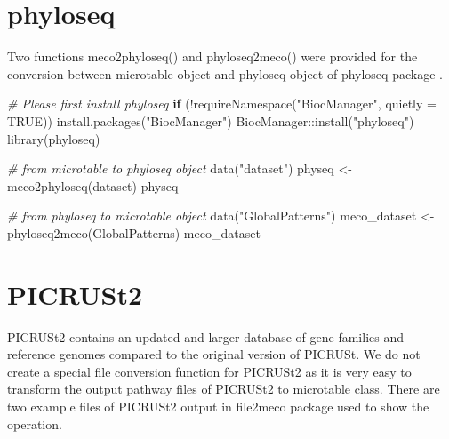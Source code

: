 \documentclass[
]{book}
\newenvironment{Shaded}{\begin{snugshade}}{\end{snugshade}}
\newcommand{\AttributeTok}[1]{\textcolor[rgb]{0.77,0.63,0.00}{#1}}
\newcommand{\CommentTok}[1]{\textcolor[rgb]{0.56,0.35,0.01}{\textit{#1}}}
\newcommand{\ConstantTok}[1]{\textcolor[rgb]{0.00,0.00,0.00}{#1}}
\newcommand{\ControlFlowTok}[1]{\textcolor[rgb]{0.13,0.29,0.53}{\textbf{#1}}}
\newcommand{\FunctionTok}[1]{\textcolor[rgb]{0.00,0.00,0.00}{#1}}
\newcommand{\NormalTok}[1]{#1}
\newcommand{\OtherTok}[1]{\textcolor[rgb]{0.56,0.35,0.01}{#1}}
\newcommand{\SpecialCharTok}[1]{\textcolor[rgb]{0.00,0.00,0.00}{#1}}
\newcommand{\StringTok}[1]{\textcolor[rgb]{0.31,0.60,0.02}{#1}}
\begin{document}
\hypertarget{phyloseq}{%
\section{phyloseq}\label{phyloseq}}

Two functions meco2phyloseq() and phyloseq2meco() were provided for the conversion between microtable object and phyloseq object of phyloseq package \citep{Mcmurdie_phyloseq_2013}.

\begin{Shaded}
\begin{Highlighting}[]
\CommentTok{\# Please first install phyloseq}
\ControlFlowTok{if}\NormalTok{ (}\SpecialCharTok{!}\FunctionTok{requireNamespace}\NormalTok{(}\StringTok{"BiocManager"}\NormalTok{, }\AttributeTok{quietly =} \ConstantTok{TRUE}\NormalTok{)) }\FunctionTok{install.packages}\NormalTok{(}\StringTok{"BiocManager"}\NormalTok{)}
\NormalTok{BiocManager}\SpecialCharTok{::}\FunctionTok{install}\NormalTok{(}\StringTok{"phyloseq"}\NormalTok{)}
\FunctionTok{library}\NormalTok{(phyloseq)}
\end{Highlighting}
\end{Shaded}

\begin{Shaded}
\begin{Highlighting}[]
\CommentTok{\# from microtable to phyloseq object}
\FunctionTok{data}\NormalTok{(}\StringTok{"dataset"}\NormalTok{)}
\NormalTok{physeq }\OtherTok{\textless{}{-}} \FunctionTok{meco2phyloseq}\NormalTok{(dataset)}
\NormalTok{physeq}
\end{Highlighting}
\end{Shaded}

\begin{Shaded}
\begin{Highlighting}[]
\CommentTok{\# from phyloseq to microtable object}
\FunctionTok{data}\NormalTok{(}\StringTok{"GlobalPatterns"}\NormalTok{)}
\NormalTok{meco\_dataset }\OtherTok{\textless{}{-}} \FunctionTok{phyloseq2meco}\NormalTok{(GlobalPatterns)}
\NormalTok{meco\_dataset}
\end{Highlighting}
\end{Shaded}

\hypertarget{picrust2}{%
\section{PICRUSt2}\label{picrust2}}

PICRUSt2 \citep{Douglas_PICRUSt2_2020} contains an updated and larger database of gene families and reference genomes compared to the original version of PICRUSt.
We do not create a special file conversion function for PICRUSt2
as it is very easy to transform the output pathway files of PICRUSt2 to microtable class.
There are two example files of PICRUSt2 output in file2meco package used to show the operation.
\end{document}
